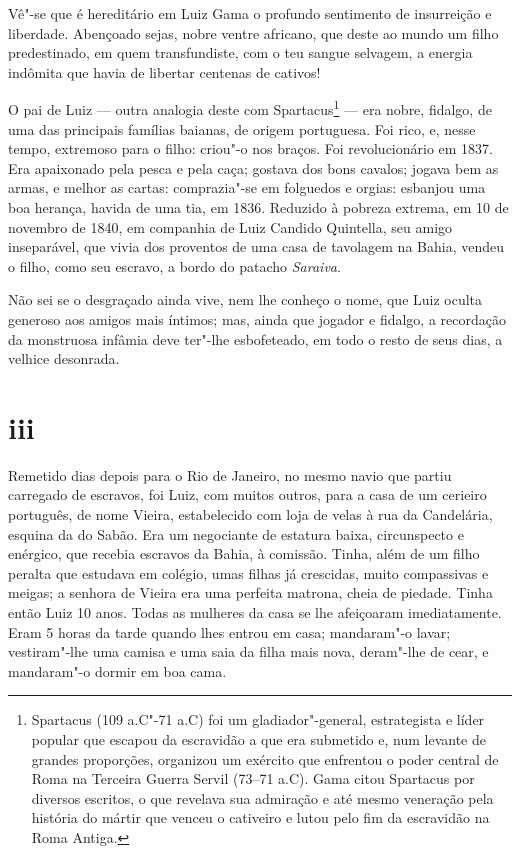Vê"-se que é hereditário em Luiz Gama o profundo sentimento de
insurreição e liberdade. Abençoado sejas, nobre ventre africano, que
deste ao mundo um filho predestinado, em quem transfundiste, com o teu
sangue selvagem, a energia indômita que havia de libertar centenas de
cativos!

O pai de Luiz --- outra analogia deste com Spartacus\footnote{
  Spartacus (109 a.C"-71 a.C) foi um gladiador"-general, estrategista e
  líder popular que escapou da escravidão a que era submetido e, num
  levante de grandes proporções, organizou um exército que enfrentou o
  poder central de Roma na Terceira Guerra Servil (73--71 a.C). Gama
  citou Spartacus por diversos escritos, o que revelava sua admiração e
  até mesmo veneração pela história do mártir que venceu o cativeiro e
  lutou pelo fim da escravidão na Roma Antiga.} --- era nobre, fidalgo,
de uma das principais famílias baianas, de origem portuguesa. Foi rico,
e, nesse tempo, extremoso para o filho: criou"-o nos braços. Foi
revolucionário em 1837. Era apaixonado pela pesca e pela caça; gostava
dos bons cavalos; jogava bem as armas, e melhor as cartas: comprazia"-se
em folguedos e orgias: esbanjou uma boa herança, havida de uma tia, em
1836. Reduzido à pobreza extrema, em 10 de novembro de 1840, em
companhia de Luiz Candido Quintella, seu amigo inseparável, que vivia
dos proventos de uma casa de tavolagem na Bahia, vendeu o filho, como
seu escravo, a bordo do patacho \emph{Saraiva}.

Não sei se o desgraçado ainda vive, nem lhe conheço o nome, que Luiz
oculta generoso aos amigos mais íntimos; mas, ainda que jogador e
fidalgo, a recordação da monstruosa infâmia deve ter"-lhe esbofeteado, em
todo o resto de seus dias, a velhice desonrada.

\section*{iii}

Remetido dias depois para o Rio de Janeiro, no mesmo navio que partiu
carregado de escravos, foi Luiz, com muitos outros, para a casa de um
cerieiro português, de nome Vieira, estabelecido com loja de velas à rua
da Candelária, esquina da do Sabão. Era um negociante de estatura baixa,
circunspecto e enérgico, que recebia escravos da Bahia, à comissão.
Tinha, além de um filho peralta que estudava em colégio, umas filhas já
crescidas, muito compassivas e meigas; a senhora de Vieira era uma
perfeita matrona, cheia de piedade. Tinha então Luiz 10 anos. Todas as
mulheres da casa se lhe afeiçoaram imediatamente. Eram 5 horas da tarde
quando lhes entrou em casa; mandaram"-o lavar; vestiram"-lhe uma camisa e
uma saia da filha mais nova, deram"-lhe de cear, e mandaram"-o dormir em
boa cama.

